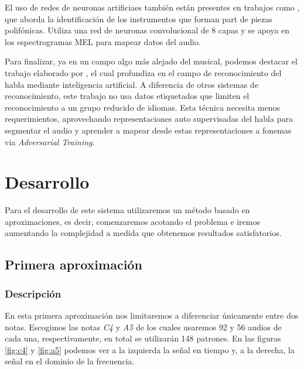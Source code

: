 \documentclass[12pt]{article}
\begin{document}
\bigskip
El uso de redes de neuronas artificiaes también están presentes en trabajos como \cite{solanki2019music}, que aborda la identificación de
los instrumentos que forman part de piezas polifónicas. Utiliza una red de neuronas convolucional de 8 capas y se apoya en los espectrogramas 
MEL para mapear datos del audio.

\bigskip
Para finalizar, ya en un campo algo más alejado del musical, podemos destacar el trabajo elaborado por \cite{baevski2021unsupervised},
el cual profundiza en el campo de reconocimiento del habla mediante inteligencia artificial.
A diferencia de otros sistemas de reconocimiento, este trabajo no usa datos etiquetados que limiten el reconocimiento a un grupo reducido de idiomas. 
Esta técnica necesita menos requerimientos, aprovechando representaciones auto supervisadas del habla para segmentar el audio y aprender a 
mapear desde estas representaciones a fonemas via \textit{Adversarial Training}.

\bigskip

\newpage
\section{Desarrollo}
\label{Desarrollo}
Para el desarrollo de este sistema utilizaremos un método basado en aproximaciones, es decir, comenzaremos acotando el problema e iremos aumentando
la complejidad a medida que obtenemos resultados satisfatorios.
\subsection{Primera aproximación}
\label{Primera aproximación}

\subsubsection{Descripción}
En esta primera aproximación nos limitaremos a diferenciar únicamente entre dos notas. 
Escogimos las notas \textit{C4} y \textit{A5} de los cuales usaremos 92 y 56 audios de cada una, respectivamente, en total
se utilizarán 148 patrones. En las figuras \ref{fig:c4} y \ref{fig:a5} podemos ver a la izquierda la señal en tiempo y, a la derecha,
la señal en el dominio de la frecuencia.
\end{document}

